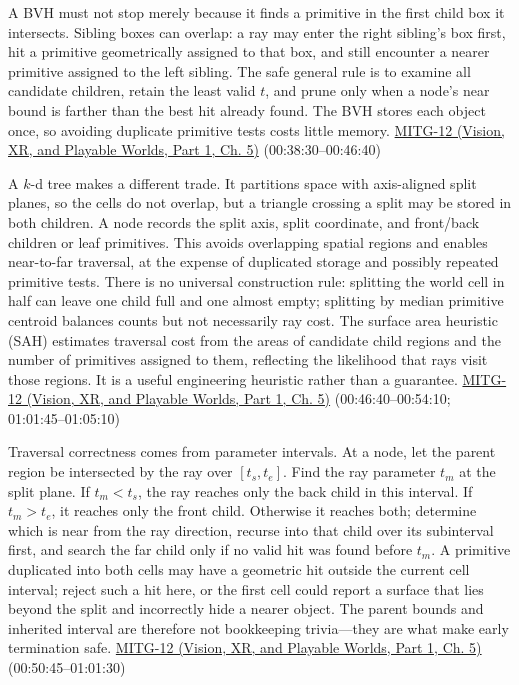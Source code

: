 A BVH must not stop merely because it finds a primitive in the first child box it intersects. Sibling boxes can overlap: a ray may enter the right sibling's box first, hit a primitive geometrically assigned to that box, and still encounter a nearer primitive assigned to the left sibling. The safe general rule is to examine all candidate children, retain the least valid \(t\), and prune only when a node's near bound is farther than the best hit already found. The BVH stores each object once, so avoiding duplicate primitive tests costs little memory. \href{../07-Vision-XR-and-Playable-Worlds-P01/main.pdf\#nameddest=04-visual-computing-ii-ch036-mitg-12---ray-tracing-ii}{MITG-12 (Vision, XR, and Playable Worlds, Part 1, Ch. 5)} (00:38:30--00:46:40)

A \(k\)-d tree makes a different trade. It partitions space with axis-aligned split planes, so the cells do not overlap, but a triangle crossing a split may be stored in both children. A node records the split axis, split coordinate, and front/back children or leaf primitives. This avoids overlapping spatial regions and enables near-to-far traversal, at the expense of duplicated storage and possibly repeated primitive tests. There is no universal construction rule: splitting the world cell in half can leave one child full and one almost empty; splitting by median primitive centroid balances counts but not necessarily ray cost. The surface area heuristic (SAH) estimates traversal cost from the areas of candidate child regions and the number of primitives assigned to them, reflecting the likelihood that rays visit those regions. It is a useful engineering heuristic rather than a guarantee. \href{../07-Vision-XR-and-Playable-Worlds-P01/main.pdf\#nameddest=04-visual-computing-ii-ch036-mitg-12---ray-tracing-ii}{MITG-12 (Vision, XR, and Playable Worlds, Part 1, Ch. 5)} (00:46:40--00:54:10; 01:01:45--01:05:10)

Traversal correctness comes from parameter intervals. At a node, let the parent region be intersected by the ray over \([t_s,t_e]\). Find the ray parameter \(t_m\) at the split plane. If \(t_m<t_s\), the ray reaches only the back child in this interval. If \(t_m>t_e\), it reaches only the front child. Otherwise it reaches both; determine which is near from the ray direction, recurse into that child over its subinterval first, and search the far child only if no valid hit was found before \(t_m\). A primitive duplicated into both cells may have a geometric hit outside the current cell interval; reject such a hit here, or the first cell could report a surface that lies beyond the split and incorrectly hide a nearer object. The parent bounds and inherited interval are therefore not bookkeeping trivia---they are what make early termination safe. \href{../07-Vision-XR-and-Playable-Worlds-P01/main.pdf\#nameddest=04-visual-computing-ii-ch036-mitg-12---ray-tracing-ii}{MITG-12 (Vision, XR, and Playable Worlds, Part 1, Ch. 5)} (00:50:45--01:01:30)

